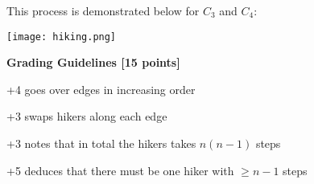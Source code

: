 \documentclass[12pt]{exam}
\begin{document}
\begin{solution}
This process is demonstrated below for $C_{3}$ and $C_{4}$:

\texttt{[image: hiking.png]}

\textbf{Grading Guidelines [15 points]}
\begin{gwguidelines}
    \item +4 goes over edges in increasing order
    \item +3 swaps hikers along each edge
    \item +3 notes that in total the hikers takes $n(n-1)$ steps
    \item +5 deduces that there must be one hiker with $ \geq n - 1$ steps
\end{gwguidelines}
\end{solution}
\end{document}
